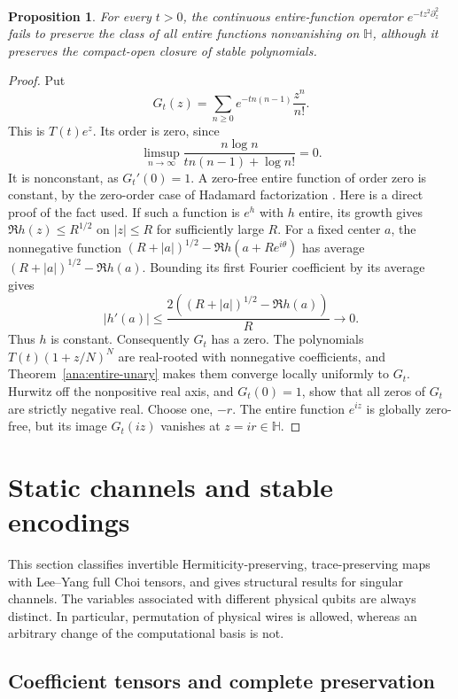 \documentclass[reqno]{amsart}
\newtheorem{proposition}[theorem]{Proposition}
\theoremstyle{definition}
\theoremstyle{remark}
\newcommand{\HH}{\mathbb H}
\begin{document}
\begin{proposition}\label{ana:all-entire-separation}
For every \(t>0\), the continuous entire-function operator
\(e^{-tz^2\partial_z^2}\) fails to preserve the class of all entire
functions nonvanishing on \(\HH\), although it preserves the
compact-open closure of stable polynomials.
\end{proposition}
\begin{proof}
Put
\[
 G_t(z)=\sum_{n\ge0}e^{-tn(n-1)}\frac{z^n}{n!}.
\]
This is \(T(t)e^z\).  Its order is zero, since
\[
 \limsup_{n\to\infty}
 \frac{n\log n}{tn(n-1)+\log n!}=0.
\]
It is nonconstant, as \(G_t'(0)=1\). A zero-free entire function of
order zero is constant, by the zero-order case of Hadamard
factorization \cite{Boas54}. Here is a direct proof of the fact used.
If such a function is \(e^h\) with \(h\) entire, its growth gives
\(\Re h(z)\le R^{1/2}\) on \(|z|\le R\) for sufficiently large \(R\).
For a fixed center \(a\), the nonnegative function
\((R+|a|)^{1/2}-\Re h(a+Re^{i\theta})\) has average
\((R+|a|)^{1/2}-\Re h(a)\). Bounding its first Fourier coefficient
by its average gives
\[
 |h'(a)|\le
 \frac{2((R+|a|)^{1/2}-\Re h(a))}{R}\longrightarrow0.
\]
Thus \(h\) is constant. Consequently \(G_t\) has a zero.
The polynomials \(T(t)(1+z/N)^N\) are real-rooted with nonnegative
coefficients, and Theorem~\ref{ana:entire-unary} makes them converge
locally uniformly to \(G_t\).
Hurwitz off the nonpositive real axis, and \(G_t(0)=1\), show that all
zeros of \(G_t\) are strictly negative real.  Choose one, \(-r\).
The entire function \(e^{iz}\) is globally zero-free, but its image
\(G_t(iz)\) vanishes at \(z=ir\in\HH\).
\end{proof}


\section{Static channels and stable encodings}
\label{stat:section}

This section classifies invertible Hermiticity-preserving, trace-preserving
maps with Lee--Yang full Choi tensors, and gives structural results for
singular channels. The
variables associated with different physical qubits are always distinct.
In particular, permutation of physical wires is allowed, whereas an arbitrary
change of the computational basis is not.

\subsection{Coefficient tensors and complete preservation}
\end{document}
